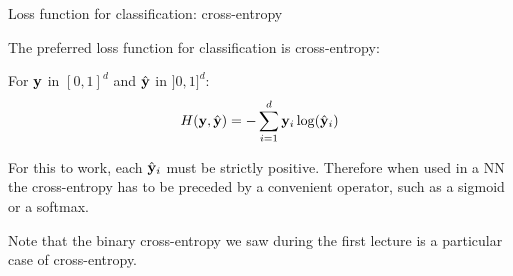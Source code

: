 \documentclass[handout,xcolor=pdftex,dvipsnames,table,mathserif]{beamer}
\begin{document}
\begin{frame}{Loss function for classification: cross-entropy}

  The preferred loss function for classification is cross-entropy:

  \begin{block}{}
    For $\mathbf{y}$ in $[0, 1]^d$ and $\hat{\mathbf{y}}$ in $]0, 1]^d$:
        \[
        H(\mathbf{y}, \hat{\mathbf{y}}) = - \sum_{i=1}^d \mathbf{y}_i \log(\hat{\mathbf{y}}_i)
        \]
  \end{block}

  \pause

  \begin{alertblock}{}
    For this to work, each $\hat{\mathbf{y}}_i$ must be strictly positive. Therefore when used in a NN the cross-entropy has to be preceded by a convenient operator, such as a sigmoid or a softmax.
  \end{alertblock}

  \pause

  Note that the binary cross-entropy we saw during the first lecture is a particular case of cross-entropy.


\end{frame}




\end{document}
